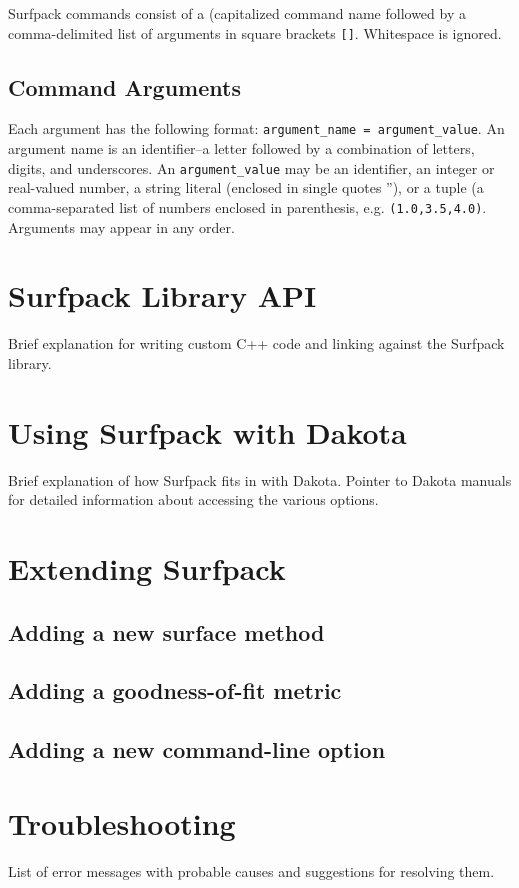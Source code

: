\documentclass{article}
\begin{document}
Surfpack commands consist of a (capitalized command name followed by a
comma-delimited list of arguments in square brackets \texttt{[]}.
Whitespace is ignored.


\subsection{Command Arguments}\label{sec:arguments}

Each argument has the following format: \texttt{argument\_name =
  argument\_value}.  An argument name is an identifier--a letter
followed by a combination of letters, digits, and underscores.  An
\texttt{argument\_value} may be an identifier, an integer or
real-valued number, a string literal (enclosed in single quotes ''),
or a tuple (a comma-separated list of numbers enclosed in parenthesis,
e.g. \texttt{(1.0,3.5,4.0)}.  Arguments may appear in any order.

\section{Surfpack Library API}
Brief explanation for writing custom C++ code and linking against the Surfpack library.

\section{Using Surfpack with Dakota}
Brief explanation of how Surfpack fits in with Dakota.  Pointer to Dakota manuals for detailed information about accessing the various options.

\section{Extending Surfpack}
\subsection{Adding a new surface method}
\subsection{Adding a goodness-of-fit metric}
\subsection{Adding a new command-line option}

\section{Troubleshooting}
List of error messages with probable causes and suggestions for resolving them.
\end{document}
